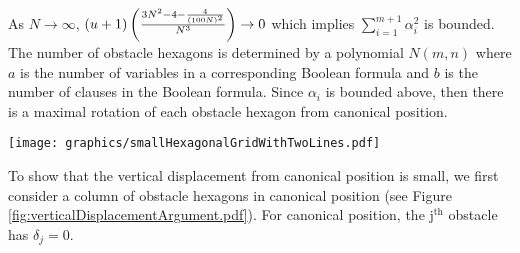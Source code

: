 
As $N \rightarrow \infty$, $(u+1) \left( \frac{3N^2 - 4 - \frac{4}{(100N)^2}}{N^3} \right)\rightarrow 0$ which implies $\sum_{i = 1}^{m+1} \alpha_i^2$ is bounded.  
The number of obstacle hexagons is determined by a polynomial $N(m,n)$ where $a$ is the number of variables in a corresponding Boolean formula and $b$ is the number of clauses in the Boolean formula.
Since $\alpha_i$ is bounded above, then there is a maximal rotation of each obstacle hexagon from canonical position.




\begin{minipage}{\linewidth}
\begin{center}
\texttt{[image: graphics/smallHexagonalGridWithTwoLines.pdf]}
\label{fig:smallHexagonalGridWithTwoLines.pdf}
\end{center}
\end{minipage}
To show that the vertical displacement from canonical position is small, we first consider a column of obstacle hexagons in canonical position (see Figure \ref{fig:verticalDisplacementArgument.pdf}).  
For canonical position, the $\text{j}^\text{th}$ obstacle has $\delta_j = 0$.

